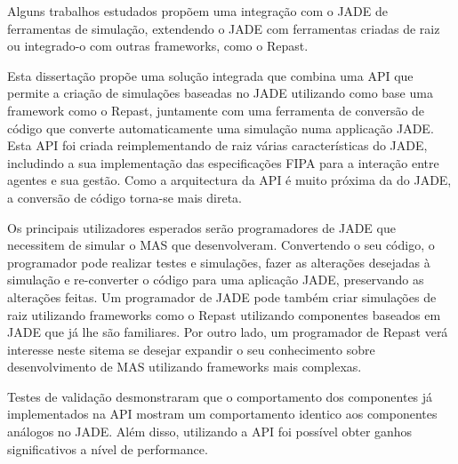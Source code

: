 Alguns trabalhos estudados \cite{garcia2011misia,gormer2011jrep} propõem uma integração com o JADE de ferramentas de simulação, extendendo o JADE com ferramentas criadas de raiz ou integrado-o com outras frameworks, como o Repast.

Esta dissertação propõe uma solução integrada que combina uma API que permite a criação de simulações baseadas no JADE utilizando como base uma framework como o Repast, juntamente com uma ferramenta de conversão de código que converte automaticamente uma simulação numa applicação JADE. Esta API foi criada reimplementando de raiz várias características do JADE, includindo a sua implementação das especificações FIPA para a interação entre agentes e sua gestão. Como a arquitectura da API é muito próxima da do JADE, a conversão de código torna-se mais direta.

Os principais utilizadores esperados serão programadores de JADE que necessitem de simular o MAS que desenvolveram. Convertendo o seu código, o programador pode realizar testes e simulações, fazer as alterações desejadas à simulação e re-converter o código para uma aplicação JADE, preservando as alterações feitas. Um programador de JADE pode também criar simulações de raiz utilizando frameworks como o Repast utilizando componentes baseados em JADE que já lhe são familiares. Por outro lado, um programador de Repast verá interesse neste sitema se desejar expandir o seu conhecimento sobre desenvolvimento de MAS utilizando frameworks mais complexas.

Testes de validação desmonstraram que o comportamento dos componentes já implementados na API mostram um comportamento identico aos componentes análogos no JADE. Além disso, utilizando a API foi possível obter ganhos significativos a nível de performance.
